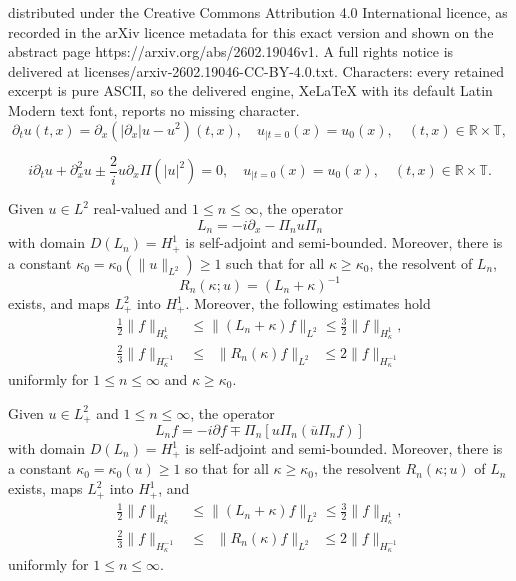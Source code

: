 \documentclass[10pt,a4paper]{amsart}
\newcommand{\ol}[1]{\overline{#1}}
\begin{document}
distributed under the Creative Commons Attribution 4.0 International licence, as recorded in the arXiv licence metadata for this exact version and shown on the abstract page https://arxiv.org/abs/2602.19046v1. A full rights notice is delivered at licenses/arxiv-2602.19046-CC-BY-4.0.txt. Characters: every retained excerpt is pure ASCII, so the delivered engine, XeLaTeX with its default Latin Modern text font, reports no missing character.
\begin{equation}\label{eq:BO}\tag{BO}
\partial_t u(t,x) = \partial_x \left( |\partial_x| u - u^2 \right)(t,x), \quad  u_{|t=0}(x) = u_0(x), \quad (t,x) \in \mathbb{R} \times \mathbb{T}, 
\end{equation}

\begin{equation}\label{eq:CS}\tag{CCM}
i\partial_t u + \partial_x^2u \pm \frac{2}{i} u\partial_x \Pi(|u|^2) = 0,\quad  u_{|t=0}(x)= u_{0}(x), \quad (t,x) \in \mathbb{R} \times \mathbb{T}. 
\end{equation}%

\begin{prop}
\label{prop:lax}
Given $u\in L^2$ real-valued and $1 \le n \le \infty$, the operator
\begin{equation*}
L_n  = -i\partial_x - \Pi_n  u \Pi_n 
\end{equation*}
with domain $D(L_n) = H^1_+$ is self-adjoint and semi-bounded.  Moreover, there is a constant $\kappa_0 = \kappa_0(\|u\|_{L^2}) \geq 1$ such that for all $\kappa\geq\kappa_0$, the resolvent of $L_n$,
\[
R_n(\kappa;u) = (L_n + \kappa)^{-1}
\] 
exists, and maps $L^2_+$ into $H^{1}_+$. Moreover, the following estimates hold 
\begin{align}
\tfrac12\|f\|_{H^1_\kappa} &\le \| (L_n+\kappa)f \|_{L^2} \le \tfrac32 \|f\|_{H^1_\kappa} ,
\label{L} \\
\tfrac23\| f\|_{H^{-1}_\kappa} &\le\;\; \| R_n(\kappa)f \|_{L^2}\;\; \le2 \| f\|_{H^{-1}_\kappa}
\label{R}
\end{align}
uniformly for $1\leq n\leq \infty$ and $\kappa\geq\kappa_0$.
\end{prop}

\begin{prop}
\label{prop:lax'}
Given $u\in L^2_+$ and $1\leq n\leq \infty$, the operator
\begin{equation*}
L_n f = -i\partial f \mp \Pi_n [ u \Pi_n (\ol{u} \Pi_nf) ]
\end{equation*}
with domain $D(L_n) = H^1_+$ is self-adjoint and semi-bounded.  Moreover, there is a constant $\kappa_0 = \kappa_0(u) \geq 1$ so that for all $\kappa\geq\kappa_0$, the resolvent $R_n(\kappa;u)$ of $L_n$ exists, maps $L^2_+$ into $H^{1}_+$, and 
\begin{align}
\tfrac12\|f\|_{H^1_\kappa} &\le \| (L_n+\kappa)f \|_{L^2} \le \tfrac32 \|f\|_{H^1_\kappa} ,
\label{L'} \\
\tfrac23\| f\|_{H^{-1}_\kappa} &\le\;\; \| R_n(\kappa)f \|_{L^2}\;\; \le2 \| f\|_{H^{-1}_\kappa}
\label{R'}
\end{align}
uniformly for $1\leq n\leq \infty$.
\end{prop}
\end{document}
